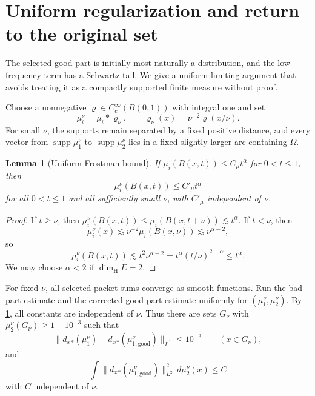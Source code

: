 \documentclass[11pt,letterpaper]{amsart}
\newtheorem{lemma}[lemma]{Lemma}
\newcommand{\supp}{\operatorname{supp}}
\newcommand{\norm}[1]{\lVert#1\rVert}
\begin{document}
\section{Uniform regularization and return to the original set}\label{sec:regularization}

The selected good part is initially most naturally a distribution, and the low-frequency term has a Schwartz tail. We give a uniform limiting argument that avoids treating it as a compactly supported finite measure without proof.

Choose a nonnegative $\varrho\in C_c^\infty(B(0,1))$ with integral one and set
\[
 \mu_i^\nu=\mu_i*\varrho_\nu,
 \qquad \varrho_\nu(x)=\nu^{-2}\varrho(x/\nu).
\]
For small $\nu$, the supports remain separated by a fixed positive distance, and every vector from $\supp\mu_1^\nu$ to $\supp\mu_2^\nu$ lies in a fixed slightly larger arc containing $\Omega$.

\begin{lemma}[Uniform Frostman bound]\label{lem:uniform-frostman}
If $\mu_i(B(x,t))\le C_\mu t^\alpha$ for $0<t\le1$, then
\[
 \mu_i^\nu(B(x,t))\le C'_\mu t^\alpha
\]
for all $0<t\le1$ and all sufficiently small $\nu$, with $C'_\mu$ independent of $\nu$.
\end{lemma}

\begin{proof}
If $t\ge\nu$, then
$\mu_i^\nu(B(x,t))\le\mu_i(B(x,t+\nu))\lesssim t^\alpha$.
If $t<\nu$, then
\[
 \mu_i^\nu(x)\lesssim \nu^{-2}\mu_i(B(x,\nu))\lesssim\nu^{\alpha-2},
\]
so
\[
 \mu_i^\nu(B(x,t))\lesssim t^2\nu^{\alpha-2}
 =t^\alpha(t/\nu)^{2-\alpha}\le t^\alpha.
\]
We may choose $\alpha<2$ if $\dim_{\mathrm H}E=2$.
\end{proof}

For fixed $\nu$, all selected packet sums converge as smooth functions. Run the bad-part estimate and the corrected good-part estimate uniformly for $(\mu_1^\nu,\mu_2^\nu)$. By \cref{lem:uniform-frostman}, all constants are independent of $\nu$. Thus there are sets $G_\nu$ with
$\mu_2^\nu(G_\nu)\ge1-10^{-3}$ such that
\begin{equation}\label{eq:uniform-L1}
 \norm{d_x{}_*(\mu_1^\nu)-d_x{}_*(\mu_{1,\mathrm{good}}^\nu)}_{L^1}
 \le10^{-3}\qquad(x\in G_\nu),
\end{equation}
and
\begin{equation}\label{eq:uniform-L2}
 \int\norm{d_x{}_*(\mu_{1,\mathrm{good}}^\nu)}_{L^2}^2\,d\mu_2^\nu(x)
 \le C
\end{equation}
with $C$ independent of $\nu$.
\end{document}
